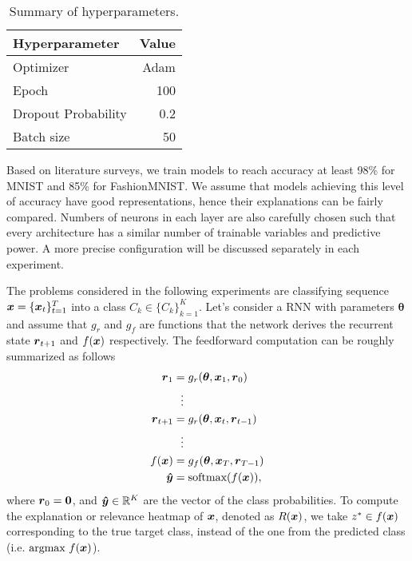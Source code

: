 \begin{table}[!htb]
\centering
\caption{Summary of hyperparameters.}
\label{tab:hyper_summary}
\begin{tabular}{l|r}
\textbf{Hyperparameter} & \multicolumn{1}{l}{\textbf{Value}} \\ \hline
Optimizer               & Adam                               \\
Epoch     & 100                                \\
Dropout Probability     & 0.2                               \\
Batch size              & 50                                
\end{tabular}

\end{table}



  Based on literature surveys, we train models to reach accuracy at least  98\% for MNIST and 85\% for FashionMNIST.  We assume that models achieving this level of accuracy have good representations, hence their explanations can be fairly compared. Numbers of neurons in each layer are also carefully chosen such that every architecture has a similar number of trainable variables and predictive power.  A more precise configuration will be discussed separately in each experiment. 

The problems considered in the following experiments are classifying sequence $\boldsymbol{x}= \{ \boldsymbol{x}_t \}_{t=1}^T$ into a class $C_k \in \{ C_k \}_{k=1}^K$. Let's consider a RNN with parameters $\boldsymbol{\theta}$ and assume that $g_r$ and $g_{f}$ are functions that the network derives the recurrent state $\patvector{r}_{t+1}$ and $f(\boldsymbol{x})$ respectively. The feedforward computation can be roughly summarized as follows
 \begin{align}
  	\patvector{r}_{1} &= g_r(\patvector{\theta}, \patvector{x}_1, \patvector{r}_0) \\
  	&\ \ \vdots\\
 	\patvector{r}_{t+1} &= g_r(\patvector{\theta}, \patvector{x}_t, \patvector{r}_{t-1}) \\
 	 &\ \ \vdots\\
f(\x) &= g_{f}(\patvector{\theta}, \patvector{x}_{T},  \patvector{r}_{T-1}) \\
 	\patvector{\hat{y}} &= \text{softmax}(f(\x)),
 \end{align}
 where $\patvector{r}_0 = \patvector{0}$, and $\patvector{\hat{y}} \in \mathbb{R}^K$ are the vector of the class probabilities. To compute the explanation or relevance heatmap of $\boldsymbol{x}$, denoted as $R(\boldsymbol{x})$, we take $z^* \in f(\boldsymbol{x})$ corresponding to the true target class, instead of the one from the predicted class (i.e. $\underset{}{\text{argmax}}\  f(\boldsymbol{x})$).  
 

